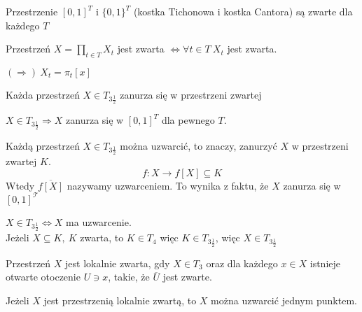 \begin{wn} Przestrzenie $[0,1]^T$ i $\{0,1\}^T$ (kostka Tichonowa i kostka Cantora) są zwarte dla każdego $T$ \end{wn} 
\begin{wn} Przestrzeń $X = \prod\limits_{t \in T} X_t$ jest zwarta $\Leftrightarrow \forall t \in T \ X_t$ jest zwarta. \end{wn} 
\begin{dd} $(\Rightarrow) \ X_t = \pi_t [x]$ \end{dd} 
\begin{wn} Każda przestrzeń $X \in T_{3 \frac{1}{2}}$ zanurza się w przestrzeni zwartej \end{wn} 
\begin{dd} $X \in T_{3 \frac{1}{2}} \Rightarrow X$ zanurza się w $[0,1]^T$ dla pewnego $T$. \end{dd} 
\begin{uw} Każdą przestrzeń $X \in T_{3 \frac{1}{2}}$ można uzwarcić, to znaczy, zanurzyć $X$ w przestrzeni zwartej $K$. 
    \[ f: X \to f[X] \subseteq K \] 
    Wtedy $\overline{f[X]}$ nazywamy uzwarceniem. To wynika z faktu, że $X$ zanurza się w $[0,1]^\mathcal T$
\end{uw} 
\begin{uw} 
    $X \in T_{3 \frac 12} \Leftrightarrow X$ ma uzwarcenie.\\ 
    Jeżeli $X \subseteq K,\ K$ zwarta, to $K \in T_4$ więc $K \in T_{3 \frac 12}$, więc $X \in T_{3\frac 12}$
\end{uw} 
\begin{df} 
    Przestrzeń $X$ jest lokalnie zwarta, gdy $X \in T_3$ oraz dla każdego $x \in X$ istnieje otwarte otoczenie $U \ni x$, takie, że 
    $\overline U$ jest zwarte.
\end{df} 
\begin{tw} 
    Jeżeli $X$ jest przestrzenią lokalnie zwartą, to $X$ można uzwarcić jednym punktem.
\end{tw} 
